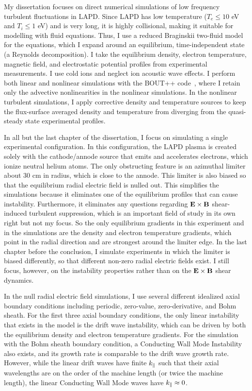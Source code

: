 My dissertation focuses on direct numerical simulations of low frequency turbulent fluctuations in LAPD. Since LAPD has low temperature ($T_e \le 10$ eV and $T_i \le 1$ eV) and is very long,
it is highly collisional, making it suitable for modelling with fluid equations. Thus, I use a reduced Braginskii two-fluid model~\cite{Braginskii1965} for the equations, which I expand around
an equilibrium, time-independent state (a Reynolds decomposition). 
I take the equilibrium density, electron temperature, magnetic field, and electrostatic potential profiles from experimental measurements. I use cold ions and neglect ion acoustic
wave effects. I perform both linear and nonlinear simulations with the BOUT++ code~\cite{dudson2009}, where I retain only the advective nonlinearities in the nonlinear simulations.
In the nonlinear turbulent simulations, I apply corrective density and temperature sources to keep the flux-surface averaged density and temperature from diverging from the quasi-steady state
experimental profiles.

In all but the last chapter of the dissertation, I focus on simulating a single experimental configuration. In this configuration, the LAPD plasma is created solely with the cathode/annode
source that emits and accelerates electrons, which ionize neutral helium atoms. The only obstructing feature is an azimuthal limiter about 30 cm in radius, which is close to the annode. 
This limiter is also biased so that the equilibrium radial electric field
is nulled out. This simplifies the simulations because it eliminates one of the equilibrium profiles that can cause instability. Furthermore, it eliminates any questions regarding
${\bf E \times B}$ shear-induced turbulent suppression, which is an important field of study in its own right but not my focus.
So the only equilibrium gradients in this experiment and in the simulations are the density and electron temperature gradients, which point in the radial direction and are strongest around the limiter edge.
In the last chapter before the conclusion, I simulate experiments in which the limiter is biased differently, so that different non-zero radial electric fields exist. I still focus, however, on the instability
properties rather than on the ${\bf E \times B}$ shear dynamics.

In the null radial electric field simulations, I use several different idealized axial boundary conditions including periodic, zero-value, zero-derivative, and Bohm sheath. For the first three
axial boundary conditions, the only linear instability that exists in the model is the drift wave instability, which can be driven by both the equilibrium density and electron temperature gradients.
For the simulation with the Bohm sheath boundary condition, a Conducting Wall Mode Instability also exists, and its growth rate is comparable to the drift wave growth rate. However, while the linear
drift waves have finite $k_\parallel$ such that their axial wavelengths are on the order of the machine length (or twice the machine length), the linear Conducting Wall Mode waves have $k_\parallel \approx 0$.


